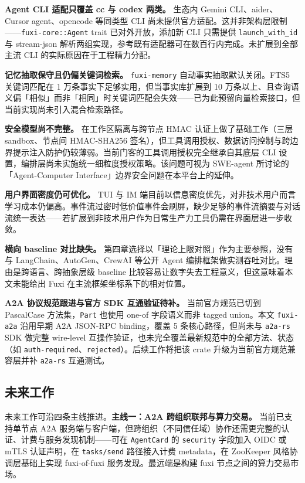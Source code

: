 \textbf{Agent CLI 适配只覆盖 cc 与 codex 两类。} 生态内 Gemini CLI、aider、Cursor agent、opencode 等同类型 CLI 尚未提供官方适配。这并非架构层限制——\texttt{fuxi-core::Agent} trait 已对外开放，添加新 CLI 只需提供 \texttt{launch\_with\_id} 与 stream-json 解析两组实现，参考既有适配器可在数百行内完成。未扩展到全部主流 CLI 的实际原因在于工程精力分配。

\textbf{记忆抽取保守且仍偏关键词检索。} \texttt{fuxi-memory} 自动事实抽取默认关闭。FTS5 关键词匹配在 1 万条事实下足够实用，但当事实库扩展到 10 万条以上、且查询语义偏「相似」而非「相同」时关键词匹配会失效——已为此预留向量检索接口，但当前实现尚未引入混合检索路径。

\textbf{安全模型尚不完整。} 在工作区隔离与跨节点 HMAC 认证上做了基础工作（三层 sandbox、节点间 HMAC-SHA256 签名），但工具调用授权、数据访问控制与跨边界提示注入防护仍较薄弱。当前门客的工具调用授权完全继承自其底层 CLI 设置，编排层尚未实施统一细粒度授权策略。该问题可视为 SWE-agent\parencite{yang2024sweagent} 所讨论的「Agent-Computer Interface」边界安全问题在本平台上的延伸。

\textbf{用户界面密度仍可优化。} TUI 与 IM 端目前以信息密度优先，对非技术用户而言学习成本仍偏高。事件流过密时低价值事件会刷屏，缺少足够的事件流摘要与对话流统一表达——若扩展到非技术用户作为日常生产力工具仍需在界面层进一步收敛。

\textbf{横向 baseline 对比缺失。} 第四章选择以「理论上限对照」作为主要参照，没有与 LangChain、AutoGen、CrewAI 等公开 Agent 编排框架做实测吞吐对比。理由是跨语言、跨抽象层级 baseline 比较容易让数字失去工程意义，但这意味着本文未能给出 Fuxi 在主流框架坐标系下的相对位置。

\textbf{A2A 协议规范跟进与官方 SDK 互通验证待补。} 当前官方规范已切到 PascalCase 方法集，\texttt{Part} 也使用 one-of 字段语义而非 tagged union。本文 \texttt{fuxi-a2a} 沿用早期 A2A JSON-RPC binding，覆盖 5 条核心路径，但尚未与 \texttt{a2a-rs} SDK 做完整 wire-level 互操作验证，也未完全覆盖最新规范中的全部方法、状态（如 \texttt{auth-required}、\texttt{rejected}）。后续工作将把该 crate 升级为当前官方规范兼容层并补 \texttt{a2a-rs} 互通测试。

\subsection{未来工作}
\label{subsec:future-work}

未来工作可沿四条主线推进。\textbf{主线一：A2A 跨组织联邦与算力交易。} 当前已支持单节点 A2A 服务端与客户端，但跨组织（不同信任域）协作还需更完整的认证、计费与服务发现机制——可在 \texttt{AgentCard} 的 \texttt{security} 字段加入 OIDC 或 mTLS 认证声明，在 \texttt{tasks/send} 路径接入计费 metadata，在 ZooKeeper\parencite{hunt2010zookeeper} 风格协调层基础上实现 fuxi-of-fuxi 服务发现。最远端是构建 fuxi 节点之间的算力交易市场。

